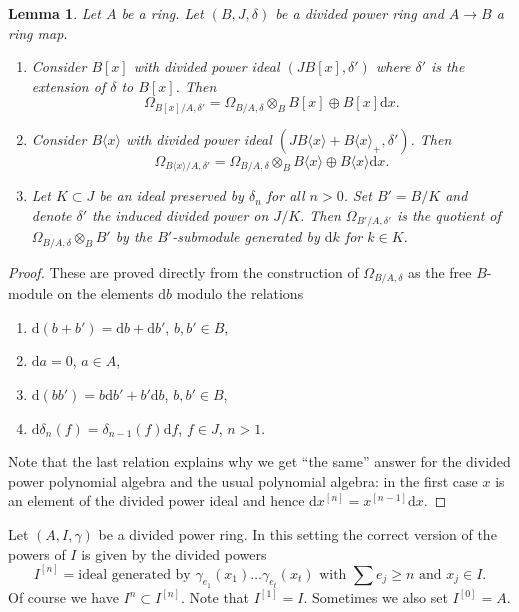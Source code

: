 \documentclass{stacks-project}
\theoremstyle{plain}
\newtheorem{lemma}[subsection]{Lemma}
\theoremstyle{definition}
\theoremstyle{remark}
\numberwithin{equation}{subsection}
\begin{document}
\begin{lemma}
\label{lemma-omega}
Let $A$ be a ring. Let $(B, J, \delta)$ be a divided power ring and
$A \to B$ a ring map. 
\begin{enumerate}
\item Consider $B[x]$ with divided power ideal $(JB[x], \delta')$
where $\delta'$ is the extension of $\delta$ to $B[x]$. Then
$$
\Omega_{B[x]/A, \delta'} =
\Omega_{B/A, \delta} \otimes_B B[x] \oplus B[x]\text{d}x.
$$
\item Consider $B\langle x \rangle$ with divided power ideal
$(JB\langle x \rangle + B\langle x \rangle_{+}, \delta')$. Then
$$
\Omega_{B\langle x\rangle/A, \delta'} =
\Omega_{B/A, \delta} \otimes_B B\langle x \rangle \oplus
B\langle x\rangle \text{d}x.
$$
\item Let $K \subset J$ be an ideal preserved by $\delta_n$ for
all $n > 0$. Set $B' = B/K$ and denote $\delta'$ the induced
divided power on $J/K$. Then $\Omega_{B'/A, \delta'}$ is the quotient
of $\Omega_{B/A, \delta} \otimes_B B'$ by the $B'$-submodule generated
by $\text{d}k$ for $k \in K$.
\end{enumerate}
\end{lemma}

\begin{proof}
These are proved directly from the construction of $\Omega_{B/A, \delta}$
as the free $B$-module on the elements $\text{d}b$ modulo the relations
\begin{enumerate}
\item $\text{d}(b + b') = \text{d}b + \text{d}b'$, $b, b' \in B$,
\item $\text{d}a = 0$, $a \in A$,
\item $\text{d}(bb') = b \text{d}b' + b' \text{d}b$, $b, b' \in B$,
\item $\text{d}\delta_n(f) = \delta_{n - 1}(f)\text{d}f$, $f \in J$, $n > 1$.
\end{enumerate}
Note that the last relation explains why we get ``the same'' answer for
the divided power polynomial algebra and the usual polynomial algebra:
in the first case $x$ is an element of the divided power ideal and hence
$\text{d}x^{[n]} = x^{[n - 1]}\text{d}x$.
\end{proof}

\noindent
Let $(A, I, \gamma)$ be a divided power ring. In this setting the
correct version of the powers of $I$ is given by the divided powers
$$
I^{[n]} = \text{ideal generated by }
\gamma_{e_1}(x_1) \ldots \gamma_{e_t}(x_t)
\text{ with }\sum e_j \geq n\text{ and }x_j \in I.
$$
Of course we have $I^n \subset I^{[n]}$. Note that $I^{[1]} = I$.
Sometimes we also set $I^{[0]} = A$.
\end{document}

